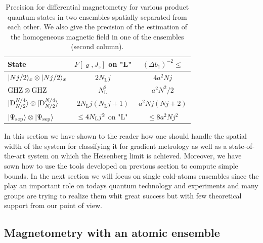 \begin{table}
\begin{tabular}{|l|c|c|}
\hline
State & $F[\varrho,J_z]$ on "L" & $(\Delta b_1)^{-2}\leq$ \\
\hline
$\vert{Nj/2}\rangle_{x}\otimes \vert{Nj/2}\rangle_{x} $ & $2N_{\text{L}}j$ & $4a^2Nj$ \\
\hline
$\textnormal{GHZ} \otimes \textnormal{GHZ}$ & $N_{\text{L}}^2$ & $a^2N^2/2 $\\
\hline
$\vert{\text{D}_{N/2}^{N/4}}\rangle\otimes \vert{\text{D}_{N/2}^{N/4}}\rangle$ & $2N_{\text{L}}j(N_{\text{L}}j+1)$ & $a^2Nj(Nj+2)$\\
  \hline
$\vert{\Psi_{\rm sep}}\rangle \otimes \vert{\Psi_{\rm sep}}\rangle$ & $\le 4N_{\rm L}j^2$ on "L" & $\le 8a^2Nj^2$ \\
\hline
\end{tabular}
\caption{Precision for differential magnetometry for various product quantum states in two ensembles spatially separated from each other. We also give the precision of the estimation of the homogeneous magnetic field in one of the ensembles (second column).
}
\label{tab:result-states-two-ensembles}
\end{table}

In this section we have shown to the reader how one should handle the spatial width of the system for classifying it for gradient metrology as well as a state-of-the-art system on which the Heisenberg limit is achieved. Moreover, we have sown how to use the tools developed on previous section to compute simple bounds. In the next section we will focus on single cold-atoms ensembles since the play an important role on todays quantum technology and experiments and many groups are trying to realize them whit great success but with few theoretical support from our point of view.

\subsection{Magnetometry with an atomic ensemble}
\label{sec:gm-single-cloud}

